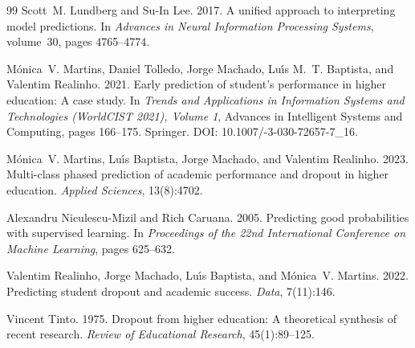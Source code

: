 \documentclass[11pt]{article}
\begin{document}
\begin{thebibliography}{99}
  Scott~M. Lundberg and Su-In Lee. 2017.
  \newblock A unified approach to interpreting model predictions.
  \newblock In \emph{Advances in Neural Information Processing Systems}, volume~30, pages 4765--4774.
   
  M\'onica~V. Martins, Daniel Tolledo, Jorge Machado, Lu\'{\i}s M.~T. Baptista, and Valentim Realinho. 2021.
  \newblock Early prediction of student's performance in higher education: A case study.
  \newblock In \emph{Trends and Applications in Information Systems and Technologies (WorldCIST 2021), Volume 1}, Advances in Intelligent Systems and Computing, pages 166--175. Springer.
  \newblock DOI: 10.1007/-3-030-72657-7\_16.
   
  M\'onica~V. Martins, Lu\'{\i}s Baptista, Jorge Machado, and Valentim Realinho. 2023.
  \newblock Multi-class phased prediction of academic performance and dropout in higher education.
  \newblock \emph{Applied Sciences}, 13(8):4702.
   
  Alexandru Niculescu-Mizil and Rich Caruana. 2005.
  \newblock Predicting good probabilities with supervised learning.
  \newblock In \emph{Proceedings of the 22nd International Conference on Machine Learning}, pages 625--632.
   
  Valentim Realinho, Jorge Machado, Lu\'{\i}s Baptista, and M\'onica~V. Martins. 2022.
  \newblock Predicting student dropout and academic success.
  \newblock \emph{Data}, 7(11):146.
   
  Vincent Tinto. 1975.
  \newblock Dropout from higher education: A theoretical synthesis of recent research.
  \newblock \emph{Review of Educational Research}, 45(1):89--125.
   
  \end{thebibliography}
  
\end{document}
